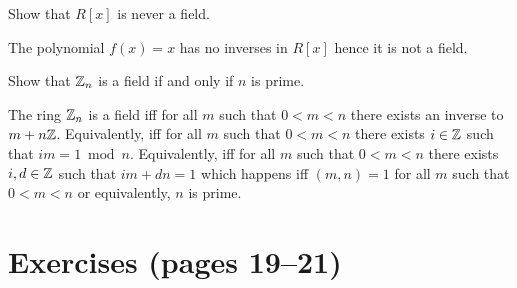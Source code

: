 \begin{myenumerate}
\item
\begin{excopy}
Show that \(R[x]\) is never a field.
\end{excopy}

The polynomial \(f(x)=x\) has no inverses in \(R[x]\) hence
it is not a field.

\item
\begin{excopy}
Show that \(\mathbb{Z}_n\) is a field if and only if $n$ is prime.
\end{excopy}

The ring \(\mathbb{Z}_n\) is a field iff
for all $m$ such that \(0<m<n\) there exists an inverse to \(m+n\mathbb{Z}\).
Equivalently,  iff for all $m$ such that \(0<m<n\) there exists
\(i\in\mathbb{Z}\) such that \(im=1\bmod n\).
Equivalently,  iff for all $m$ such that \(0<m<n\) there exists
\(i,d\in\mathbb{Z}\) such that \(im+dn=1\) which happens
iff \((m,n)=1\) for all $m$ such that \(0<m<n\)
or equivalently, $n$ is prime.

\end{myenumerate}



\section{Exercises (pages 19--21)}

